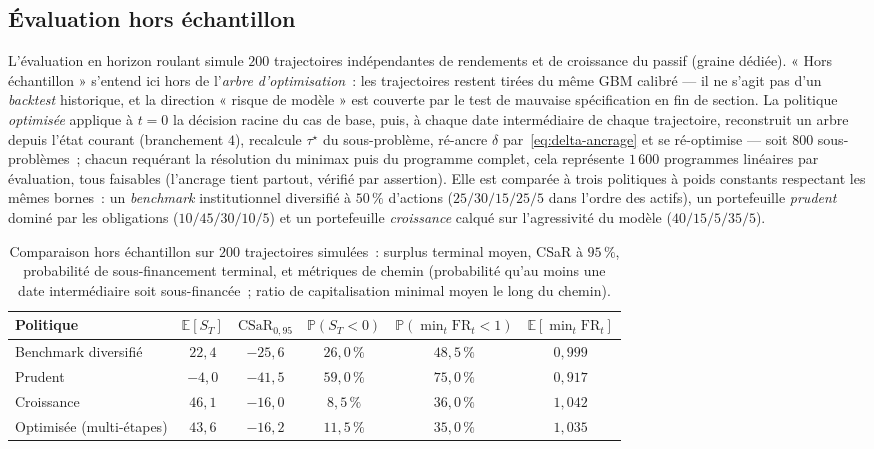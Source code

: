 \documentclass[11pt,letterpaper]{article}
\newcommand{\E}{\mathbb{E}}
\newcommand{\prob}{\mathbb{P}}
\newcommand{\CSaR}{\mathrm{CSaR}}
\newcommand{\taustar}{\tau^{\star}}
\theoremstyle{definition}
\begin{document}
\subsection{Évaluation hors échantillon}\label{ssec:resultats-he}

L'évaluation en horizon roulant simule $200$ trajectoires indépendantes de
rendements et de croissance du passif (graine dédiée). « Hors échantillon »
s'entend ici hors de l'\emph{arbre d'optimisation}~: les trajectoires restent
tirées du même GBM calibré --- il ne s'agit pas d'un \emph{backtest}
historique, et la direction « risque de modèle » est couverte par le test de
mauvaise spécification en fin de section. La politique \emph{optimisée} applique à $t=0$ la décision
racine du cas de base, puis, à chaque date intermédiaire de chaque trajectoire,
reconstruit un arbre depuis l'état courant (branchement $4$), recalcule
$\taustar$ du sous-problème, ré-ancre $\delta$ par~\eqref{eq:delta-ancrage} et
se ré-optimise --- soit $800$ sous-problèmes~; chacun requérant la résolution
du minimax puis du programme complet, cela représente $1\,600$ programmes
linéaires par évaluation, tous faisables (l'ancrage tient partout, vérifié par
assertion). Elle est comparée à trois politiques à
poids constants respectant les mêmes bornes~: un \emph{benchmark}
institutionnel diversifié à $50\,\%$ d'actions ($25/30/15/25/5$ dans l'ordre des actifs),
un portefeuille \emph{prudent} dominé par les obligations ($10/45/30/10/5$) et
un portefeuille \emph{croissance} calqué sur l'agressivité du modèle
($40/15/5/35/5$).

\begin{table}[htbp]
\centering
\caption{Comparaison hors échantillon sur $200$ trajectoires simulées~:
surplus terminal moyen, CSaR à $95\,\%$, probabilité de sous-financement
terminal, et métriques de chemin (probabilité qu'au moins une date
intermédiaire soit sous-financée~; ratio de capitalisation minimal moyen le
long du chemin).}
\label{tab:horsech}
\begin{tabular}{lccccc}
\toprule
Politique & $\E[S_T]$ & $\CSaR_{0{,}95}$ & $\prob(S_T<0)$ &
$\prob(\min_t \mathrm{FR}_t < 1)$ & $\E[\min_t \mathrm{FR}_t]$ \\
\midrule
Benchmark diversifié & $22{,}4$ & $-25{,}6$ & $26{,}0\,\%$ & $48{,}5\,\%$ & $0{,}999$ \\
Prudent           & $-4{,}0$ & $-41{,}5$ & $59{,}0\,\%$ & $75{,}0\,\%$ & $0{,}917$ \\
Croissance        & $46{,}1$ & $-16{,}0$ & $8{,}5\,\%$  & $36{,}0\,\%$ & $1{,}042$ \\
Optimisée (multi-étapes) & $43{,}6$ & $-16{,}2$ & $11{,}5\,\%$ & $35{,}0\,\%$ & $1{,}035$ \\
\bottomrule
\end{tabular}
\end{table}
\end{document}
